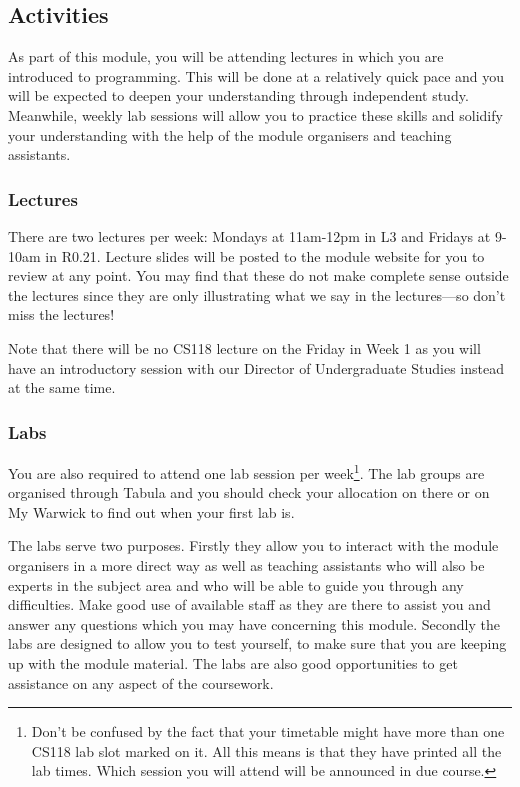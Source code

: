 \pagebreak

\subsection{Activities}

As part of this module, you will be attending lectures in which you are introduced to programming. This will be done at a relatively quick pace and you will be expected to deepen your understanding through independent study. Meanwhile, weekly lab sessions will allow you to practice these skills and solidify your understanding with the help of the module organisers and teaching assistants.

\subsubsection{Lectures}

There are two lectures per week: Mondays at 11am-12pm in L3 and Fridays at 9-10am in R0.21. Lecture slides will be posted to the module website for you to review at any point. You may find that these do not make complete sense outside the lectures since they are only illustrating what we say in the lectures---so don't miss the lectures!
 
{\bf \lectureOne }

Note that there will be no CS118 lecture on the Friday in Week 1 as you will have an introductory session with our Director of Undergraduate Studies instead at the same time.

\subsubsection{Labs}
 
You are also required to attend one lab session per week\footnote{Don't be confused by the fact that your timetable might have more than one CS118 lab slot marked on it. All this means is that they have printed all the lab times. Which session you will attend will be announced in due course.}. 
The lab groups are organised through Tabula and you 
should check your allocation on there or on My Warwick to find out when your first lab is. 
 
The labs serve two purposes. Firstly they allow you to interact with the module organisers in a more direct way as well as teaching assistants who will also be experts in the subject area and who will be able to guide you through any difficulties. Make good use of available staff as they are there to assist you and answer any questions which you may have concerning this module. Secondly the labs are designed to allow you to test yourself, to make sure that you are keeping up with the module material. The labs are also good opportunities to get assistance on any aspect of the coursework.
 
